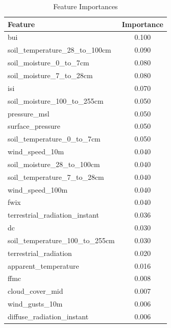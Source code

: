 \begin{table}[H]
	\caption{Feature Importances}
	\centering
	\label{feature_importances}
	\begin{tabular}{lc}
		\hline
		Feature                                & Importance \\ \hline
		bui                                        & 0.100       \\ 
		soil\_temperature\_28\_to\_100cm        & 0.090       \\ 
		soil\_moisture\_0\_to\_7cm               & 0.080       \\ 
		soil\_moisture\_7\_to\_28cm             & 0.080       \\ 
		isi                                       & 0.070       \\ 
		soil\_moisture\_100\_to\_255cm         & 0.050       \\ 
		pressure\_msl                           & 0.050       \\ 
		surface\_pressure                       & 0.050       \\ 
		soil\_temperature\_0\_to\_7cm           & 0.050       \\ 
		wind\_speed\_10m                        & 0.040       \\ 
		soil\_moisture\_28\_to\_100cm          & 0.040       \\ 
		soil\_temperature\_7\_to\_28cm          & 0.040       \\ 
		wind\_speed\_100m                       & 0.040       \\ 
		fwix                                     & 0.040       \\ 
		terrestrial\_radiation\_instant           & 0.036       \\ 
		dc                                         & 0.030       \\ 
		soil\_temperature\_100\_to\_255cm       & 0.030       \\ 
		terrestrial\_radiation                   & 0.020       \\ 
		apparent\_temperature                 & 0.016       \\ 
		ffmc                                       & 0.008       \\ 
		cloud\_cover\_mid                       & 0.007       \\ 
		wind\_gusts\_10m                        & 0.006       \\ 
		diffuse\_radiation\_instant             & 0.006       \\ 

\end{tabular}
\end{table}
